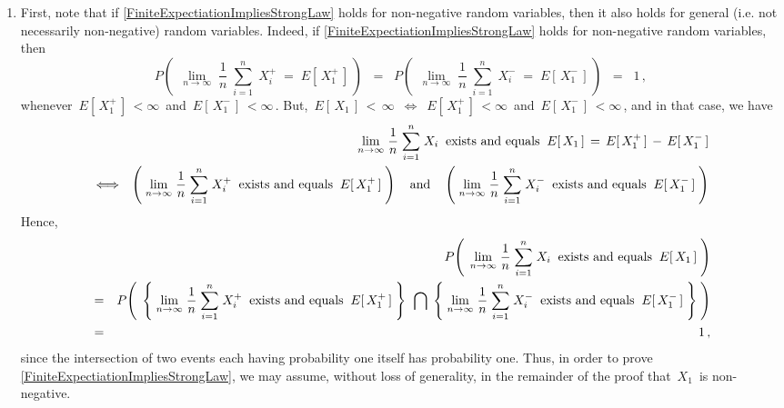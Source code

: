 \begin{enumerate}
\item

First, note that if \eqref{FiniteExpectiationImpliesStrongLaw} holds for non-negative random variables,
then it also holds for general (i.e. not necessarily non-negative) random variables.
Indeed, if \eqref{FiniteExpectiationImpliesStrongLaw} holds for non-negative random variables, then
\begin{equation*}
P\!\left(\;\,
	\underset{n\rightarrow\infty}{\lim}\;
	\dfrac{1}{n}\;\overset{n}{\underset{i=1}{\sum}}\;X_{i}^{+} \;=\; E[\,X_{1}^{+}\,]
	\,\right)
\;\; = \;\;
	P\!\left(\;\,
		\underset{n\rightarrow\infty}{\lim}\;
		\dfrac{1}{n}\;\overset{n}{\underset{i=1}{\sum}}\;X_{i}^{-} \;=\; E[\,X_{1}^{-}\,]
		\,\right)
\;\; = \;\; 1\,,
\end{equation*}
whenever \,$E[\,X_{1}^{+}\,] \, < \infty$\, and \,$E[\,X_{1}^{-}\,] \, < \infty$\,.
But, \,$E[\,X_{1}\,] \,<\, \infty$\, $\Longleftrightarrow$ \,$E[\,X_{1}^{+}\,] \, < \infty$\, and \,$E[\,X_{1}^{-}\,] \, < \infty$\,,
and in that case, we have
\begin{eqnarray*}
&&
	\underset{n\rightarrow\infty}{\lim}\;
		\dfrac{1}{n}\;\overset{n}{\underset{i=1}{\sum}}\;X_{i}
		\;\;\textnormal{exists and equals}\;\;
		E[\,X_{1}\,] \,=\, E[\,X_{1}^{+}\,] \, - \, E[\,X_{1}^{-}\,]
\\
& \Longleftrightarrow &
	\left(\;
		\underset{n\rightarrow\infty}{\lim}\;
		\dfrac{1}{n}\;\overset{n}{\underset{i=1}{\sum}}\;X_{i}^{+}
		\;\;\textnormal{exists and equals}\;\;
		E[\,X_{1}^{+}\,]
		\;\right)
	\quad\textnormal{and}\quad
	\left(\;
		\underset{n\rightarrow\infty}{\lim}\;
		\dfrac{1}{n}\;\overset{n}{\underset{i=1}{\sum}}\;X_{i}^{-}
		\;\;\textnormal{exists and equals}\;\;
		E[\,X_{1}^{-}\,]
		\;\right)
\end{eqnarray*}
Hence,
\begin{eqnarray*}
&&
	P\!\left(\;\,
		\underset{n\rightarrow\infty}{\lim}\;
		\dfrac{1}{n}\;\overset{n}{\underset{i=1}{\sum}}\;X_{i}
		\;\;\textnormal{exists and equals}\;\;
		E[\,X_{1}\,]
		\;\right)
\\
& = &
	P\!\left(\;\,
		\left\{\;
			\underset{n\rightarrow\infty}{\lim}\;
			\dfrac{1}{n}\;\overset{n}{\underset{i=1}{\sum}}\;X_{i}^{+}
			\;\;\textnormal{exists and equals}\;\;
			E[\,X_{1}^{+}\,]
			\;\right\}
	\;\,\bigcap\;
		\left\{\;
			\underset{n\rightarrow\infty}{\lim}\;
			\dfrac{1}{n}\;\overset{n}{\underset{i=1}{\sum}}\;X_{i}^{-}
			\;\;\textnormal{exists and equals}\;\;
			E[\,X_{1}^{-}\,]
			\;\right\}
		\;\right)
\\
& = &
	1\,,
\end{eqnarray*}
since the intersection of two events each having probability one itself has probability one.
Thus, in order to prove \eqref{FiniteExpectiationImpliesStrongLaw},
we may assume, without loss of generality, in the remainder of the proof that \,$X_{1}$\, is non-negative.


\end{enumerate}
